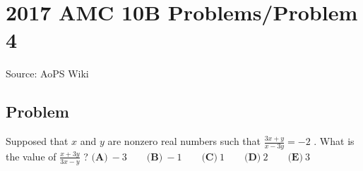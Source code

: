 \documentclass[12pt]{article}
\begin{document}
\section*{{2017 AMC 10B Problems/Problem 4}}
Source: AoPS Wiki

\subsection*{Problem}
Supposed that $x$ and $y$ are nonzero real numbers such that $\frac{3x+y}{x-3y}=-2$ . What is the value of $\frac{x+3y}{3x-y}$ ? $\textbf{(A)}\ -3\qquad\textbf{(B)}\ -1\qquad\textbf{(C)}\ 1\qquad\textbf{(D)}\ 2\qquad\textbf{(E)}\ 3$
\end{document}

